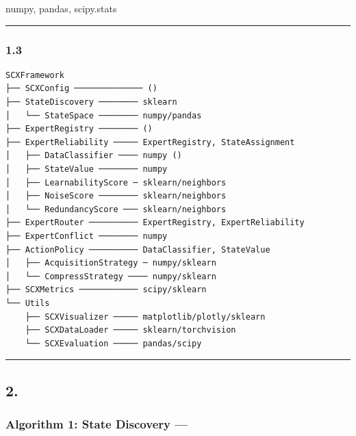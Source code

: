 \documentclass[
  12pt,
]{article}
\begin{document}
numpy, pandas, scipy.stats

\begin{center}\rule{0.5\linewidth}{0.5pt}\end{center}

\subsubsection{1.3
}\label{ux6a21ux5757ux4f9dux8d56ux5173ux7cfbux56fe}

\begin{verbatim}
SCXFramework
├── SCXConfig ────────────── ()
├── StateDiscovery ──────── sklearn
│   └── StateSpace ──────── numpy/pandas
├── ExpertRegistry ──────── ()
├── ExpertReliability ───── ExpertRegistry, StateAssignment
│   ├── DataClassifier ──── numpy ()
│   ├── StateValue ──────── numpy
│   ├── LearnabilityScore ─ sklearn/neighbors
│   ├── NoiseScore ──────── sklearn/neighbors
│   └── RedundancyScore ─── sklearn/neighbors
├── ExpertRouter ────────── ExpertRegistry, ExpertReliability
├── ExpertConflict ──────── numpy
├── ActionPolicy ────────── DataClassifier, StateValue
│   ├── AcquisitionStrategy ─ numpy/sklearn
│   └── CompressStrategy ──── numpy/sklearn
├── SCXMetrics ──────────── scipy/sklearn
└── Utils
    ├── SCXVisualizer ───── matplotlib/plotly/sklearn
    ├── SCXDataLoader ───── sklearn/torchvision
    └── SCXEvaluation ───── pandas/scipy
\end{verbatim}

\begin{center}\rule{0.5\linewidth}{0.5pt}\end{center}

\subsection{2.
}\label{ux5173ux952eux7b97ux6cd5ux4f2aux4ee3ux7801}

\subsubsection{Algorithm 1: State Discovery ---
}\label{algorithm-1-state-discovery-ux4eceux539fux59cbux6570ux636eux5230ux72b6ux6001ux7a7aux95f4}
\end{document}
